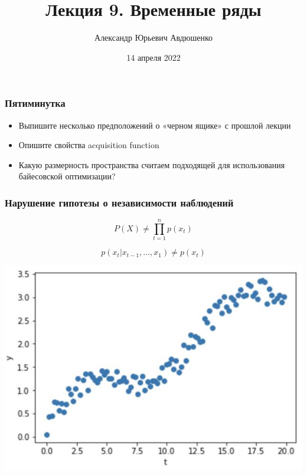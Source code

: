 \documentclass[fullscreen=true, bookmarks=true, hyperref={pdfencoding=unicode}]{beamer}
\title{Лекция 9. Временные ряды}
\author{Александр Юрьевич Авдюшенко}
\institute{МКН СПбГУ}
\date{14 апреля 2022}
\begin{document}

\begin{frame}
\transdissolve[duration=0.2]
\titlepage
\end{frame}


\begin{frame}
  \frametitle{Пятиминутка}
  \begin{itemize}
    \item Выпишите несколько предположений о «черном ящике» с прошлой лекции
    \item Опишите свойства acquisition function
    \item Какую размерность пространства считаем подходящей для использования байесовской оптимизации?
  \end{itemize}
\end{frame}


\begin{frame}
  \frametitle{Нарушение гипотезы о независимости наблюдений}

  $$ P(X) \neq \prod_{t=1}^n p(x_t)$$

  $$ p(x_t | x_{t-1}, \dots, x_1) \neq p(x_t)$$

  \begin{center}
    \includegraphics[keepaspectratio,
                   width=.5\paperwidth]{ts_example.jpg}
  \end{center}
\end{frame}
\end{document}
